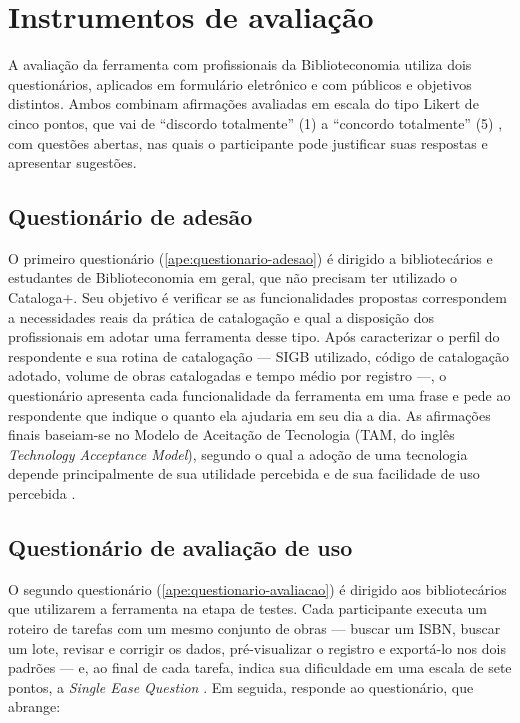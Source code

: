 \section{Instrumentos de avaliação}
\label{sec:instrumentos}

A avaliação da ferramenta com profissionais da Biblioteconomia utiliza dois questionários, aplicados em formulário eletrônico e com públicos e objetivos distintos. Ambos combinam afirmações avaliadas em escala do tipo Likert de cinco pontos, que vai de ``discordo totalmente'' (1) a ``concordo totalmente'' (5) \cite{likert1932}, com questões abertas, nas quais o participante pode justificar suas respostas e apresentar sugestões.

\subsection{Questionário de adesão}
\label{subsec:questionario-adesao}

O primeiro questionário (\autoref{ape:questionario-adesao}) é dirigido a bibliotecários e estudantes de Biblioteconomia em geral, que não precisam ter utilizado o Cataloga+. Seu objetivo é verificar se as funcionalidades propostas correspondem a necessidades reais da prática de catalogação e qual a disposição dos profissionais em adotar uma ferramenta desse tipo. Após caracterizar o perfil do respondente e sua rotina de catalogação --- SIGB utilizado, código de catalogação adotado, volume de obras catalogadas e tempo médio por registro ---, o questionário apresenta cada funcionalidade da ferramenta em uma frase e pede ao respondente que indique o quanto ela ajudaria em seu dia a dia. As afirmações finais baseiam-se no Modelo de Aceitação de Tecnologia (TAM, do inglês \textit{Technology Acceptance Model}), segundo o qual a adoção de uma tecnologia depende principalmente de sua utilidade percebida e de sua facilidade de uso percebida \cite{davis1989}.

\subsection{Questionário de avaliação de uso}
\label{subsec:questionario-avaliacao}

O segundo questionário (\autoref{ape:questionario-avaliacao}) é dirigido aos bibliotecários que utilizarem a ferramenta na etapa de testes. Cada participante executa um roteiro de tarefas com um mesmo conjunto de obras --- buscar um ISBN, buscar um lote, revisar e corrigir os dados, pré-visualizar o registro e exportá-lo nos dois padrões --- e, ao final de cada tarefa, indica sua dificuldade em uma escala de sete pontos, a \textit{Single Ease Question} \cite{sauro2009}. Em seguida, responde ao questionário, que abrange:

